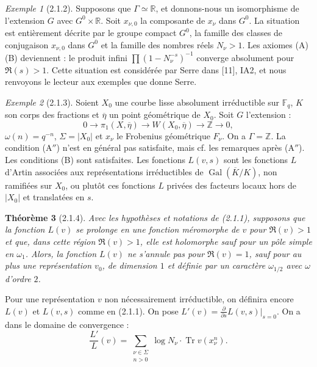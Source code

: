 \documentclass[12pt,a4paper]{article}
\theoremstyle{plain}
\newtheorem{theorem}{Th\'eor\`eme}[section]
\theoremstyle{definition}
\theoremstyle{remark}
\newtheorem{example}[theorem]{Exemple}
\DeclareMathOperator{\Gal}{Gal}
\DeclareMathOperator{\Tr}{Tr}
\newcommand{\FF}{{\mathbb{F}}}
\newcommand{\RR}{{\mathbb{R}}}
\newcommand{\ZZ}{{\mathbb{Z}}}
\begin{document}
\begin{example}[2.1.2]
Supposons que $\Gamma \simeq \RR$, et donnons-nous un isomorphisme de l'extension $G$ avec $G^0 \times \RR$. Soit $x_{\nu,0}$ la composante de $x_\nu$ dans $G^0$. La situation est enti\`erement d\'ecrite par le groupe compact $G^0$, la famille des classes de conjugaison $x_{\nu,0}$ dans $G^0$ et la famille des nombres r\'eels $N_\nu > 1$. Les axiomes (A) (B) deviennent : le produit infini $\prod (1 - N_\nu^{-s})^{-1}$ converge absolument pour $\Re(s) > 1$. Cette situation est consid\'er\'ee par Serre dans [11], IA2, et nous renvoyons le lecteur aux exemples que donne Serre.
\end{example}

\begin{example}[2.1.3]
Soient $X_0$ une courbe lisse absolument irr\'eductible sur $\FF_q$, $K$ son corps des fractions et $\overline{\eta}$ un point g\'eom\'etrique de $X_0$. Soit $G$ l'extension :
\[ 0 \to \pi_1(X, \overline{\eta}) \to W(X_0, \overline{\eta}) \to \ZZ \to 0, \]
$\omega(n) = q^{-n}$, $\Sigma = |X_0|$ et $x_\nu$ le Frobenius g\'eom\'etrique $F_\nu$. On a $\Gamma = \ZZ$. La condition (A$''$) n'est en g\'en\'eral pas satisfaite, mais cf. les remarques apr\`es (A$''$). Les conditions (B) sont satisfaites. Les fonctions $L(v, s)$ sont les fonctions $L$ d'Artin associ\'ees aux repr\'esentations irr\'eductibles de $\Gal(\overline{K}/K)$, non ramifi\'ees sur $X_0$, ou plut\^ot ces fonctions $L$ priv\'ees des facteurs locaux hors de $|X_0|$ et translat\'ees en $s$.
\end{example}

\begin{theorem}[2.1.4]
Avec les hypoth\`eses et notations de (2.1.1), supposons que la fonction $L(v)$ se prolonge en une fonction m\'eromorphe de $v$ pour $\Re(v) > 1$ et que, dans cette r\'egion $\Re(v) > 1$, elle est holomorphe sauf pour un p\^ole simple en $\omega_1$. Alors, la fonction $L(v)$ ne s'annule pas pour $\Re(v) = 1$, sauf pour au plus une repr\'esentation $v_0$, de dimension $1$ et d\'efinie par un caract\`ere $\omega_{1/2}$ avec $\omega$ d'ordre $2$.
\end{theorem}

Pour une repr\'esentation $v$ non n\'ecessairement irr\'eductible, on d\'efinira encore $L(v)$ et $L(v,s)$ comme en (2.1.1). On pose $L'(v) = \frac{\partial}{\partial s} L(v,s)|_{s=0}$. On a dans le domaine de convergence :
\begin{equation}\label{eq:2.1.4.1}
\frac{L'}{L}(v) = \sum_{\substack{\nu \in \Sigma \\ n > 0}} \log N_\nu \cdot \Tr v(x_\nu^n).
\end{equation}
\end{document}
